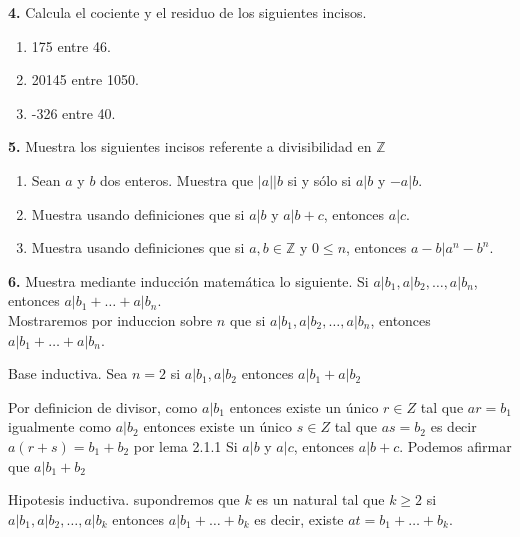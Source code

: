 \documentclass[12pt]{article}
\begin{document}
%
%
\textbf{4.} Calcula el cociente y el residuo de los siguientes incisos.

    \begin{enumerate}[label=\alph*)]

        \item 175 entre 46.

        \item 20145 entre 1050.

        \item -326 entre 40.

    \end{enumerate}
\vspace{1cm}

%
%
\textbf{5.} Muestra los siguientes incisos referente a divisibilidad en $\mathbb{Z}$

    \begin{enumerate}[label=\alph*)]
        \item Sean $a$ y $b$ dos enteros. Muestra que $|a| | b$ si y sólo si $a | b$ y $-a |b$.

        \item Muestra usando definiciones que si $a | b$ y $a | b + c$, entonces $a | c$.

        \item Muestra usando definiciones que si $a , b \in \mathbb{Z}$ y $0 \leq n$, entonces $a - b | a^n - b^n$.
           \end{enumerate}

\vspace{1cm}

%
%
\textbf{6.} Muestra mediante inducción matemática lo siguiente. Si $a | b_1, a | b_2, \dots, a | b_n$, entonces $a | b_1 + \dots + a | b_n$.\\

Mostraremos por induccion sobre $n$ que si $a | b_1, a | b_2, \dots, a | b_n$, entonces $a | b_1 + \dots + a | b_n$.

Base inductiva. Sea $n = 2$ si $a | b_1, a | b_2$ entonces $a | b_1 + a | b_2$

Por definicion de divisor, como $a | b_1$ entonces existe un único $r \in Z$ tal que $ar = b_1$
igualmente como $a | b_2$ entonces existe un único $s \in Z$ tal que $as = b_2$
es decir $a(r+s) = b_1 + b_2$
por lema 2.1.1 Si $a | b$ y $a | c$, entonces $a | b + c$. Podemos afirmar que $a | b_1 + b_2$

Hipotesis inductiva. supondremos que $k$ es un natural tal que $k \geq 2$ si $a | b_1, a | b_2, \dots, a | b_k$ entonces $a | b_1 + \dots + b_k$ es decir, existe $at = b_1 + \dots + b_k$.
\end{document}
